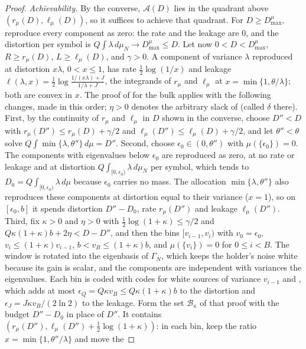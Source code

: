 \documentclass[11pt,onecolumn]{IEEEtran}
\begin{document}
\begin{proof}
\emph{Achievability.} By the converse, $\mathcal A(D)$ lies in the
quadrant above $(r_\mu(D),\ell_\mu(D))$, so it suffices to achieve that
quadrant. For $D\ge D_{\max}^\mu$, reproduce every component as zero:
the rate and the leakage are $0$, and the distortion per symbol is
$Q\int\lambda\,d\mu_N\to D_{\max}^\mu\le D$. Let now
$0<D<D_{\max}^\mu$, $R\ge r_\mu(D)$, $L\ge\ell_\mu(D)$, and $\gamma>0$.
A component of variance $\lambda$ reproduced at distortion $x\lambda$,
$0<x\le1$, has rate $\tfrac12\log(1/x)$ and leakage
$\ell(\lambda,x)=\tfrac12\log\frac{1/(x\lambda)+J}{1/\lambda+J}$, the
integrands of $r_\mu$ and $\ell_\mu$ at $x=\min\{1,\theta/\lambda\}$;
both are convex in $x$. The proof of \cite[Theorem~26]{part3} for the
bulk applies with the following changes, made in this order; $\eta>0$
denotes the arbitrary slack of \cite[Lemma~12]{part3} (called $\delta$
there). First, by the continuity of $r_\mu$ and $\ell_\mu$ in $D$
shown in the converse, choose $D''<D$ with
$r_\mu(D'')\le r_\mu(D)+\gamma/2$ and $\ell_\mu(D'')\le\ell_\mu(D)+\gamma/2$,
and let $\theta''<\theta$ solve $Q\int\min\{\lambda,\theta''\}\,d\mu=D''$.
Second, choose $\epsilon_0\in(0,\theta'')$ with $\mu(\{\epsilon_0\})=0$.
The components with eigenvalues below $\epsilon_0$ are reproduced as
zero, at no rate or leakage and at distortion
$Q\int_{[0,\epsilon_0)}\lambda\,d\mu_N$ per symbol, which tends to
$D_0=Q\int_{[0,\epsilon_0)}\lambda\,d\mu$ because $\epsilon_0$ carries
no mass. The allocation $\min\{\lambda,\theta''\}$ also reproduces
these components at distortion equal to their variance ($x=1$), so on
$[\epsilon_0,b]$ it spends
distortion $D''-D_0$, rate $r_\mu(D'')$ and leakage $\ell_\mu(D'')$.
Third, fix $\kappa>0$ and $\eta>0$ with $\tfrac12\log(1+\kappa)\le\gamma/2$
and $Q\kappa(1+\kappa)b+2\eta<D-D''$, and then the bins
$[v_{i-1},v_i)$ with $v_0=\epsilon_0$, $v_i\le(1+\kappa)v_{i-1}$,
$b<v_B\le(1+\kappa)b$, and $\mu(\{v_i\})=0$ for $0\le i<B$. The window
is rotated into the eigenbasis of $\Gamma_N$, which keeps the holder's
noise white because its gain is scalar, and the components are
independent with variances the eigenvalues. Each bin is coded with
codes for white sources of variance $v_{i-1}$ and \cite[Lemma~12]{part3},
which adds at most $\epsilon_Q=Q\kappa v_B\le Q\kappa(1+\kappa)b$ to the
distortion and $\epsilon_J=J\kappa v_B/(2\ln2)$ to the leakage. Form the
set $\mathcal B_\kappa$ of that proof with the budget $D''-D_0$ in place
of $D''$. It contains $(r_\mu(D''),\ell_\mu(D'')+\tfrac12\log(1+\kappa))$:
in each bin, keep the ratio $x=\min\{1,\theta''/\lambda\}$ and move the

\end{proof}
\end{document}
